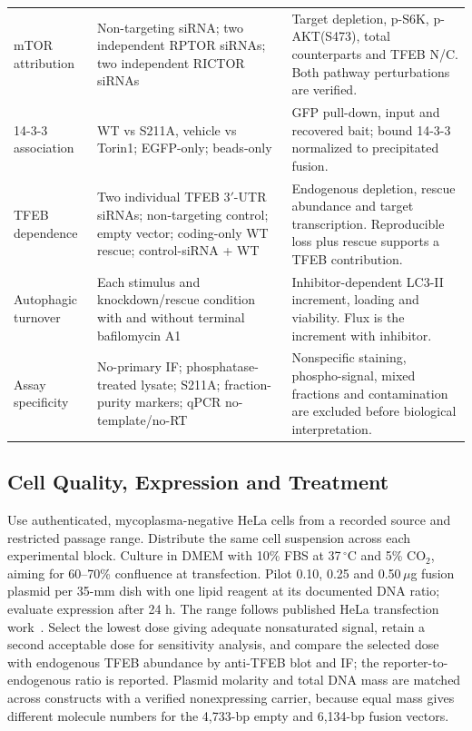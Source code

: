 \begin{longtable}{L{0.18\textwidth}L{0.35\textwidth}L{0.39\textwidth}}
mTOR attribution & Non-targeting siRNA; two independent RPTOR siRNAs; two independent RICTOR siRNAs & Target depletion, p-S6K, p-AKT(S473), total counterparts and TFEB N/C. Both pathway perturbations are verified. \\
14-3-3 association & WT vs S211A, vehicle vs Torin1; EGFP-only; beads-only & GFP pull-down, input and recovered bait; bound 14-3-3 normalized to precipitated fusion. \\
TFEB dependence & Two individual TFEB 3$'$-UTR siRNAs; non-targeting control; empty vector; coding-only WT rescue; control-siRNA + WT & Endogenous depletion, rescue abundance and target transcription. Reproducible loss plus rescue supports a TFEB contribution. \\
Autophagic turnover & Each stimulus and knockdown/rescue condition with and without terminal bafilomycin A1 & Inhibitor-dependent LC3-II increment, loading and viability. Flux is the increment with inhibitor. \\
Assay specificity & No-primary IF; phosphatase-treated lysate; S211A; fraction-purity markers; qPCR no-template/no-RT & Nonspecific staining, phospho-signal, mixed fractions and contamination are excluded before biological interpretation. \\
\end{longtable}
\normalsize

\subsection{Cell Quality, Expression and Treatment}
Use authenticated, mycoplasma-negative HeLa cells from a recorded source and restricted passage range. Distribute the same cell suspension across each experimental block. Culture in DMEM with 10\% FBS at 37\,$^\circ$C and 5\% CO$_2$, aiming for 60--70\% confluence at transfection. Pilot 0.10, 0.25 and 0.50\,$\mu$g fusion plasmid per 35-mm dish with one lipid reagent at its documented DNA ratio; evaluate expression after 24 h. The range follows published HeLa transfection work~\cite{RoczniakFerguson2012}. Select the lowest dose giving adequate nonsaturated signal, retain a second acceptable dose for sensitivity analysis, and compare the selected dose with endogenous TFEB abundance by anti-TFEB blot and IF; the reporter-to-endogenous ratio is reported. Plasmid molarity and total DNA mass are matched across constructs with a verified nonexpressing carrier, because equal mass gives different molecule numbers for the 4,733-bp empty and 6,134-bp fusion vectors.

